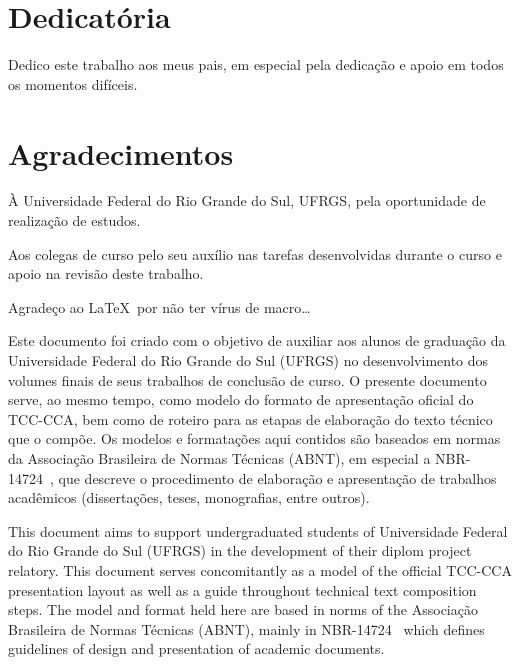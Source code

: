 \documentclass[repeatfields,xlists,xpacks,oneside]{ufrgscca}
\begin{document}

\notoc\chapter{Dedicatória}

Dedico este trabalho aos meus pais, em especial pela dedicação e apoio em
todos os momentos difíceis.

\notoc\chapter{Agradecimentos}

\`{A} Universidade Federal do Rio Grande do Sul, UFRGS, pela
oportunidade de realização de estudos.

Aos colegas de curso pelo seu auxílio nas tarefas desenvolvidas durante o
curso e apoio na revisão deste trabalho.

Agradeço ao \LaTeX\ por não ter vírus de macro\ldots



\begin{mainabstract}

Este documento foi criado com o objetivo de auxiliar aos alunos
de graduação
da Universidade Federal do Rio Grande do Sul (UFRGS) no desenvolvimento dos
volumes finais de seus trabalhos de conclus\~{a}o de curso. O presente
documento serve, ao mesmo tempo, como modelo do formato de apresentação
oficial do TCC-CCA, bem como de roteiro para as etapas de elaboração do texto
técnico que o compõe. Os modelos e formatações aqui contidos são baseados em
normas da Associação Brasileira de Normas Técnicas (ABNT), em especial a
NBR-14724~\cite{ABNT:NBR-14724-2011}, que descreve o procedimento de elaboração e
apresentação de trabalhos acadêmicos (dissertações, teses, monografias,
entre outros).

\end{mainabstract}


\begin{otherabstract}
This document aims to support undergraduated students  of Universidade Federal do Rio
Grande do Sul (UFRGS) in the development of their diplom project relatory.
This document serves concomitantly as a model of the official TCC-CCA
presentation layout as well as a guide throughout technical text composition
steps. The model and format held here are based in norms of the Associação
Brasileira de Normas Técnicas (ABNT), mainly in
NBR-14724~\cite{ABNT:NBR-14724-2011} which defines guidelines of design and
presentation of academic documents.
\end{otherabstract}
\end{document}
